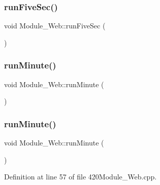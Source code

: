 \subsubsection{\texorpdfstring{run\+Five\+Sec()}{runFiveSec()}\hspace{0.1cm}{\footnotesize\ttfamily [2/2]}}
{\footnotesize\ttfamily void Module\+\_\+\+Web\+::run\+Five\+Sec (\begin{DoxyParamCaption}{ }\end{DoxyParamCaption})}

\mbox{\label{class_module___web_a580c12222077d148fe86cd0b07b263ec}} 
\subsubsection{\texorpdfstring{run\+Minute()}{runMinute()}\hspace{0.1cm}{\footnotesize\ttfamily [1/2]}}
{\footnotesize\ttfamily void Module\+\_\+\+Web\+::run\+Minute (\begin{DoxyParamCaption}{ }\end{DoxyParamCaption})}

\mbox{\label{class_module___web_a580c12222077d148fe86cd0b07b263ec}} 
\subsubsection{\texorpdfstring{run\+Minute()}{runMinute()}\hspace{0.1cm}{\footnotesize\ttfamily [2/2]}}
{\footnotesize\ttfamily void Module\+\_\+\+Web\+::run\+Minute (\begin{DoxyParamCaption}{ }\end{DoxyParamCaption})}



Definition at line 57 of file 420\+Module\+\_\+\+Web.\+cpp.

